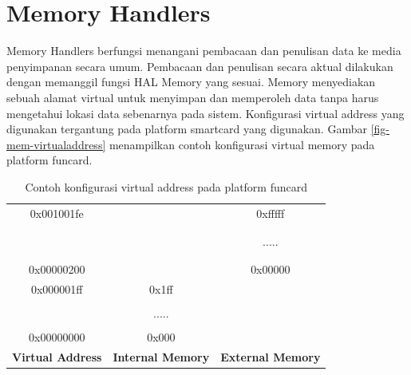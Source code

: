 \chapter{Memory Handlers}
\label{chap_memory}

Memory Handlers berfungsi menangani pembacaan dan penulisan data ke media penyimpanan secara umum. Pembacaan dan penulisan secara aktual dilakukan dengan memanggil fungsi HAL Memory yang sesuai. Memory menyediakan sebuah alamat virtual untuk menyimpan dan memperoleh data tanpa harus mengetahui lokasi data sebenarnya pada sistem. Konfigurasi virtual address yang digunakan tergantung pada platform smartcard yang digunakan. Gambar \ref{fig-mem-virtualaddress} menampilkan contoh konfigurasi virtual memory pada platform funcard.

\begin{table}[h]
  \centering
  \begin{tabular}{ c c c }
    \cline{3-3}
    0x001001fe &       & \multicolumn{1}{|c|}{0xfffff} \\
    \cline{3-3}
               &       & \multicolumn{1}{|c|}{}        \\
               &       & \multicolumn{1}{|c|}{}        \\
               &       & \multicolumn{1}{|c|}{.....}   \\
               &       & \multicolumn{1}{|c|}{}        \\
               &       & \multicolumn{1}{|c|}{}        \\
    \cline{3-3}
    0x00000200 &       & \multicolumn{1}{|c|}{0x00000} \\
    \cline{2-2}\cline{3-3}
    0x000001ff & \multicolumn{1}{|c|}{0x1ff} &         \\
    \cline{2-2}
               & \multicolumn{1}{|c|}{}      &         \\
               & \multicolumn{1}{|c|}{.....} &         \\
               & \multicolumn{1}{|c|}{}      &         \\
    \cline{2-2}
    0x00000000 & \multicolumn{1}{|c|}{0x000} &         \\
    \cline{2-2}
    \bf{Virtual Address} & \bf{Internal Memory} & \bf{External Memory} \\
  \end{tabular}
  \caption{Contoh konfigurasi virtual address pada platform funcard}
  \label{tabel-func-memory}
\end{table}

